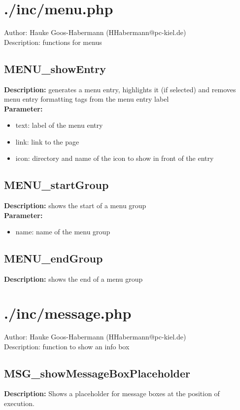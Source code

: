 \newpage\section{./inc/menu.php}
 Author: Hauke Goos-Habermann (HHabermann@pc-kiel.de)\\
 Description: functions for menus\\

\subsection{MENU\_showEntry}
\textbf{Description:} generates a menu entry, highlights it (if selected) and removes menu entry formatting tags from the menu entry label\\
\textbf{Parameter:}
\begin{itemize}
\item text: label of the menu entry
\item link: link to the page
\item icon: directory and name of the icon to show in front of the entry
\end{itemize}

\subsection{MENU\_startGroup}
\textbf{Description:} shows the start of a menu group\\
\textbf{Parameter:}
\begin{itemize}
\item name: name of the menu group
\end{itemize}

\subsection{MENU\_endGroup}
\textbf{Description:} shows the end of a menu group\\

\newpage\section{./inc/message.php}
 Author: Hauke Goos-Habermann (HHabermann@pc-kiel.de)\\
 Description: function to show an info box\\

\subsection{MSG\_showMessageBoxPlaceholder}
\textbf{Description:} Shows a placeholder for message boxes at the position of execution.\\

